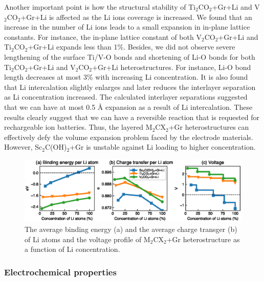 Another important point is how the structural stability of Ti$_2$CO$_2$+Gr+Li and V$_2$CO$_2$+Gr+Li is affected as the Li ions coverage is increased. We found that an increase in the number of Li ions leads to a small expansion in in-plane lattice constants.  For instance, the in-plane lattice constant of both V$_2$CO$_2$+Gr+Li and Ti$_2$CO$_2$+Gr+Li expands less than 1\%.   Besides, we did not observe  severe  lengthening of the surface Ti/V-O bonds and
shortening of Li-O bonds for both Ti$_2$CO$_2$+Gr+Li and V$_2$CO$_2$+Gr+Li heterostructures. For instance,
Li-O bond length decreases at most 3\% with increasing Li concentration.   
It is also found that Li intercalation slightly enlarges and later reduces the interlayer separation as Li concentration increased. The calculated interlayer separations suggested that we can have at most 0.5 {\AA} expansion as a result of Li intercalation. 
These results clearly suggest that we can have a reversible reaction that is requested for rechargeable ion batteries. Thus, the layered M$_2$CX$_2$+Gr heterostructures can effectively defy the volume expansion problem faced by the electrode materials. However, Sc$_2$C(OH)$_2$+Gr is unstable against Li loading to higher concentration. 

\begin{figure}[htb]
\centering
\includegraphics[width=\linewidth]{Li_con.eps}%
\caption{The average binding energy (a) and the average charge transger (b) of Li atoms and the voltage profile of M$_2$CX$_2$+Gr heterostructure as a function of Li concentration. \label{concenration}}
\end{figure}

\subsubsection{Electrochemical properties}

